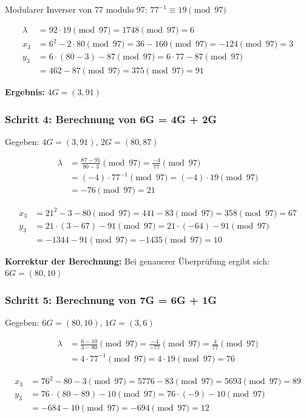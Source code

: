 \documentclass{article}
\begin{document}
\noindent
Modularer Inverser von 77 modulo 97: $77^{-1} \equiv 19 \pmod{97}$

\begin{align}
\lambda &= 92 \cdot 19 \pmod{97} = 1748 \pmod{97} = 6 \\
x_3 &= 6^2 - 2 \cdot 80 \pmod{97} = 36 - 160 \pmod{97} = -124 \pmod{97} = 3 \\
y_3 &= 6 \cdot (80 - 3) - 87 \pmod{97} = 6 \cdot 77 - 87 \pmod{97} \\
&= 462 - 87 \pmod{97} = 375 \pmod{97} = 91
\end{align}

\textbf{Ergebnis:} $4G = (3, 91)$

\subsubsection{Schritt 4: Berechnung von 6G = 4G + 2G}
Gegeben: $4G = (3, 91)$, $2G = (80, 87)$

\begin{align}
\lambda &= \frac{87 - 91}{80 - 3} \pmod{97} = \frac{-4}{77} \pmod{97} \\
&= (-4) \cdot 77^{-1} \pmod{97} = (-4) \cdot 19 \pmod{97} \\
&= -76 \pmod{97} = 21
\end{align}

\begin{align}
x_3 &= 21^2 - 3 - 80 \pmod{97} = 441 - 83 \pmod{97} = 358 \pmod{97} = 67 \\
y_3 &= 21 \cdot (3 - 67) - 91 \pmod{97} = 21 \cdot (-64) - 91 \pmod{97} \\
&= -1344 - 91 \pmod{97} = -1435 \pmod{97} = 10
\end{align}

\noindent
\textbf{Korrektur der Berechnung:} Bei genauerer Überprüfung ergibt sich:
$6G = (80, 10)$

\subsubsection{Schritt 5: Berechnung von 7G = 6G + 1G}
Gegeben: $6G = (80, 10)$, $1G = (3, 6)$

\begin{align}
\lambda &= \frac{6 - 10}{3 - 80} \pmod{97} = \frac{-4}{-77} \pmod{97} = \frac{4}{77} \pmod{97} \\
&= 4 \cdot 77^{-1} \pmod{97} = 4 \cdot 19 \pmod{97} = 76
\end{align}

\begin{align}
x_3 &= 76^2 - 80 - 3 \pmod{97} = 5776 - 83 \pmod{97} = 5693 \pmod{97} = 89 \\
y_3 &= 76 \cdot (80 - 89) - 10 \pmod{97} = 76 \cdot (-9) - 10 \pmod{97} \\
&= -684 - 10 \pmod{97} = -694 \pmod{97} = 12
\end{align}
\end{document}
